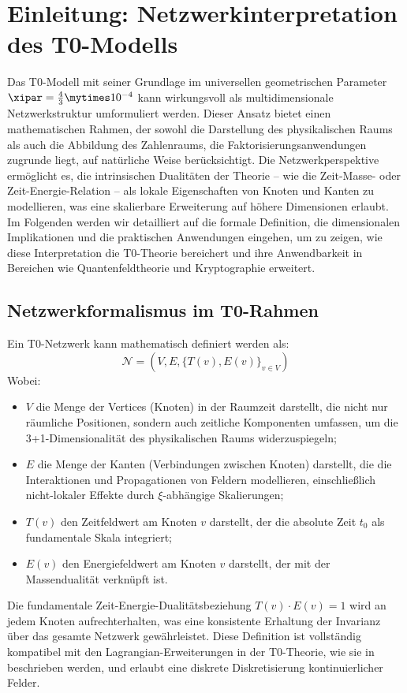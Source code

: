 \section{Einleitung: Netzwerkinterpretation des T0-Modells}
\label{sec:introduction}
Das T0-Modell mit seiner Grundlage im universellen geometrischen Parameter $\xipar = \frac{4}{3} \mytimes 10^{-4}$ kann wirkungsvoll als multidimensionale Netzwerkstruktur umformuliert werden. Dieser Ansatz bietet einen mathematischen Rahmen, der sowohl die Darstellung des physikalischen Raums als auch die Abbildung des Zahlenraums, die Faktorisierungsanwendungen zugrunde liegt, auf natürliche Weise berücksichtigt. Die Netzwerkperspektive ermöglicht es, die intrinsischen Dualitäten der Theorie -- wie die Zeit-Masse- oder Zeit-Energie-Relation -- als lokale Eigenschaften von Knoten und Kanten zu modellieren, was eine skalierbare Erweiterung auf höhere Dimensionen erlaubt. Im Folgenden werden wir detailliert auf die formale Definition, die dimensionalen Implikationen und die praktischen Anwendungen eingehen, um zu zeigen, wie diese Interpretation die T0-Theorie bereichert und ihre Anwendbarkeit in Bereichen wie Quantenfeldtheorie und Kryptographie erweitert.
\subsection{Netzwerkformalismus im T0-Rahmen}
\label{subsec:network_formalism}
Ein T0-Netzwerk kann mathematisch definiert werden als:
\begin{equation}
	\mathcal{N} = (V, E, \{T(v), E(v)\}_{v \in V})
\end{equation}
Wobei:
\begin{itemize}
	\item $V$ die Menge der Vertices (Knoten) in der Raumzeit darstellt, die nicht nur räumliche Positionen, sondern auch zeitliche Komponenten umfassen, um die 3+1-Dimensionalität des physikalischen Raums widerzuspiegeln;
	\item $E$ die Menge der Kanten (Verbindungen zwischen Knoten) darstellt, die die Interaktionen und Propagationen von Feldern modellieren, einschließlich nicht-lokaler Effekte durch $\xi$-abhängige Skalierungen;
	\item $T(v)$ den Zeitfeldwert am Knoten $v$ darstellt, der die absolute Zeit $t_0$ als fundamentale Skala integriert;
	\item $E(v)$ den Energiefeldwert am Knoten $v$ darstellt, der mit der Massendualität verknüpft ist.
\end{itemize}
Die fundamentale Zeit-Energie-Dualitätsbeziehung $T(v) \cdot E(v) = 1$ wird an jedem Knoten aufrechterhalten, was eine konsistente Erhaltung der Invarianz über das gesamte Netzwerk gewährleistet. Diese Definition ist vollständig kompatibel mit den Lagrangian-Erweiterungen in der T0-Theorie, wie sie in \cite{T0_tm_erweiterung} beschrieben werden, und erlaubt eine diskrete Diskretisierung kontinuierlicher Felder.
